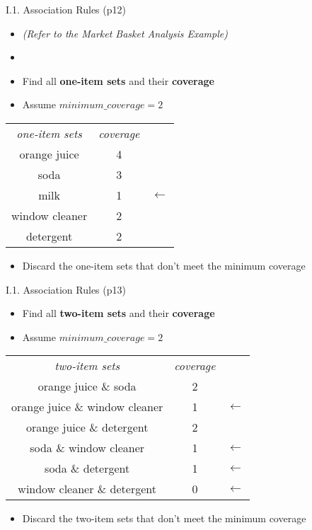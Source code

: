 \documentclass[handout]{beamer}
\newcommand{\strong}[1]{\textbf{\color{teal} #1}}
\begin{document}
\begin{frame}{I.1. Association Rules (p12)}
\begin{itemize}
\item[] \emph{(Refer to the Market Basket Analysis Example)}
\item[]
\item Find all \strong{one-item sets} and their \strong{coverage}
\item Assume $minimum\_coverage=2$
\end{itemize}
\begin{center}
\begin{tabular}{|c|c|l}
\emph{one-item sets} & \emph{coverage} \\
\cline{1-2}
orange juice & 4 \\
\cline{1-2}
soda & 3 \\
\cline{1-2}
milk & 1 & $\leftarrow$ \\
\cline{1-2}
window cleaner & 2 \\
\cline{1-2}
detergent & 2 \\
\cline{1-2}
\end{tabular}
\end{center}
\begin{itemize}
\item Discard the one-item sets that don't meet the minimum coverage
\end{itemize}
\end{frame}
\begin{frame}{I.1. Association Rules (p13)}
\begin{itemize}
\item Find all \strong{two-item sets} and their \strong{coverage}
\item Assume $minimum\_coverage=2$
\end{itemize}
\begin{center}
\begin{tabular}{|c|c|l}
\emph{two-item sets} & \emph{coverage} \\
\cline{1-2}
orange juice \& soda & 2 \\
\cline{1-2}
orange juice \& window cleaner & 1 & $\leftarrow$ \\
\cline{1-2}
orange juice \& detergent & 2 \\
\cline{1-2}
soda \& window cleaner & 1 & $\leftarrow$ \\
\cline{1-2}
soda \& detergent & 1 & $\leftarrow$ \\
\cline{1-2}
window cleaner \& detergent & 0 & $\leftarrow$ \\
\cline{1-2}
\end{tabular}
\end{center}
\begin{itemize}
\item Discard the two-item sets that don't meet the minimum coverage
\end{itemize}
\end{frame}
\end{document}
